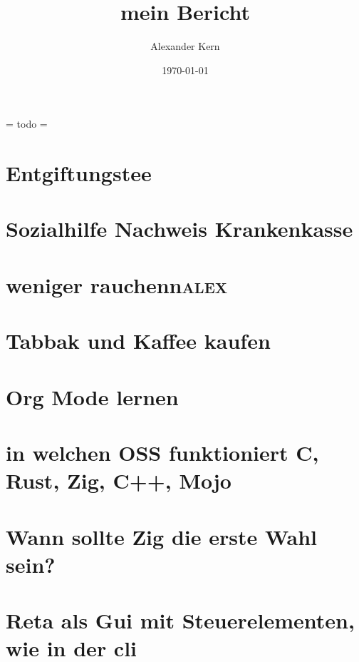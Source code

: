 \documentclass[11pt]{article}
\author{Alexander Kern}
\date{\today}
\title{mein Bericht}
\begin{document}
\maketitle
\setcounter{tocdepth}{2}
\tableofcontents

= todo =
\section{Entgiftungstee}
\label{sec:org3c18c3e}
\section{Sozialhilfe Nachweis Krankenkasse}
\label{sec:org68c199b}
\section{weniger rauchenn\hfill{}\textsc{alex}}
\label{sec:orgd36c00b}
\section{Tabbak und Kaffee kaufen}
\label{sec:orgcb93bae}
\section{Org Mode lernen}
\label{sec:orgb5b2b20}
\section{in welchen OSS funktioniert C, Rust, Zig, C++, Mojo}
\label{sec:org0e1dcca}
\section{Wann sollte Zig die erste Wahl sein?}
\label{sec:orge7942c1}
\section{Reta als Gui mit Steuerelementen, wie in der cli}
\label{sec:org5d106fd}
\end{document}
